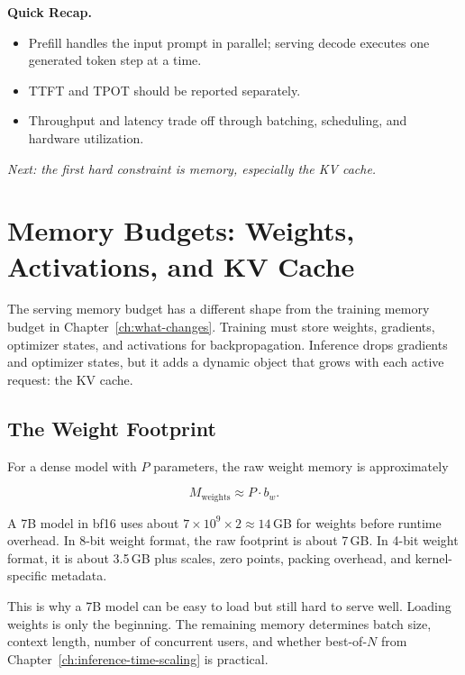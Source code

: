 \begin{quickrecap}
\textbf{Quick Recap.}
\begin{itemize}[nosep,leftmargin=1.5em]
  \item Prefill handles the input prompt in parallel; serving decode executes one generated token step at a time.
  \item TTFT and TPOT should be reported separately.
  \item Throughput and latency trade off through batching, scheduling, and hardware utilization.
\end{itemize}
\textit{Next: the first hard constraint is memory, especially the KV cache.}
\end{quickrecap}


\section{Memory Budgets: Weights, Activations, and KV Cache}
\label{sec:ch19-memory}

The serving memory budget has a different shape from the training memory budget in Chapter~\ref{ch:what-changes}. Training must store weights, gradients, optimizer states, and activations for backpropagation. Inference drops gradients and optimizer states, but it adds a dynamic object that grows with each active request: the KV cache.

\subsection{The Weight Footprint}

For a dense model with $P$ parameters, the raw weight memory is approximately

\begin{equation}
  M_{\text{weights}} \approx P \cdot b_w.
  \label{eq:ch19-weight-memory}
\end{equation}

A 7B model in bf16 uses about $7 \times 10^9 \times 2 \approx 14$\,GB for weights before runtime overhead. In 8-bit weight format, the raw footprint is about 7\,GB. In 4-bit weight format, it is about 3.5\,GB plus scales, zero points, packing overhead, and kernel-specific metadata.

This is why a 7B model can be easy to load but still hard to serve well. Loading weights is only the beginning. The remaining memory determines batch size, context length, number of concurrent users, and whether best-of-$N$ from Chapter~\ref{ch:inference-time-scaling} is practical.

